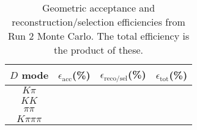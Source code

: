 \begin{table}[H]
    \centering
    \begin{tabular}{cccc}
        \toprule
        $D$ mode & $\epsilon_\mathrm{acc}$(\%) &  $\epsilon_\mathrm{reco/sel}$(\%) &  $\epsilon_\mathrm{tot}$(\%) \\
        \midrule
        $K\pi$ &  &  &  \\
        $KK$ &  &  &  \\
        $\pi\pi$ &  &  &  \\
        $K\pi\pi\pi$ &  &  &  \\
        \bottomrule
    \end{tabular}
    \caption{Geometric acceptance and reconstruction/selection efficiencies from  Run 2 Monte Carlo. The total efficiency is the  product of these.}
\label{tab:selection_efficiency_}
\end{table}
